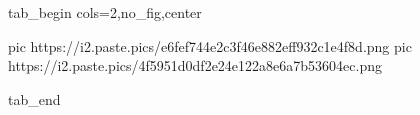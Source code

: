  
 
 
 
 


\ifcmt
  tab_begin cols=2,no_fig,center

     pic https://i2.paste.pics/e6fef744e2c3f46e882eff932c1e4f8d.png
		 pic https://i2.paste.pics/4f5951d0df2e24e122a8e6a7b53604ec.png

  tab_end
\fi
